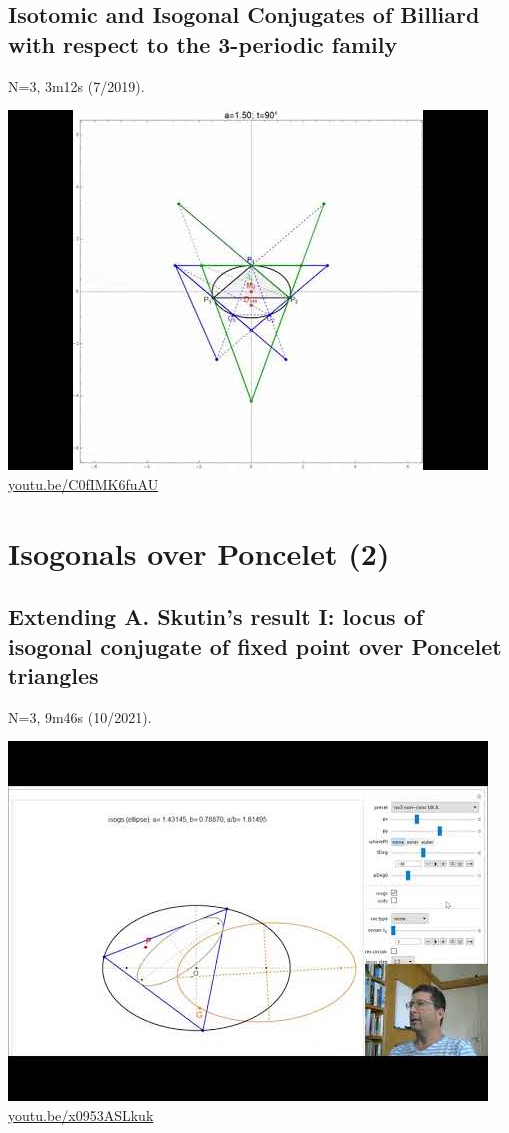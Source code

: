 \documentclass[12pt]{amsart}
\begin{document}
\subsection{Isotomic and Isogonal Conjugates of Billiard with respect to the 3-periodic family}
\label{vid:C0fIMK6fuAU}
\noindent N=3, 3m12s (7/2019). 
\begin{center}\includegraphics[width=.5\textwidth]{pics/C0fIMK6fuAU.jpg} \\ 
\href{https://youtu.be/C0fIMK6fuAU}{\url{youtu.be/C0fIMK6fuAU}}\end{center}
% 

\section{Isogonals over Poncelet (2)}

\subsection{Extending A. Skutin's result I: locus of isogonal conjugate of fixed point over Poncelet triangles}
\label{vid:x0953ASLkuk}
\noindent N=3, 9m46s (10/2021). 
\begin{center}\includegraphics[width=.5\textwidth]{pics/x0953ASLkuk.jpg} \\ 
\href{https://youtu.be/x0953ASLkuk}{\url{youtu.be/x0953ASLkuk}}\end{center}
% 
\end{document}
